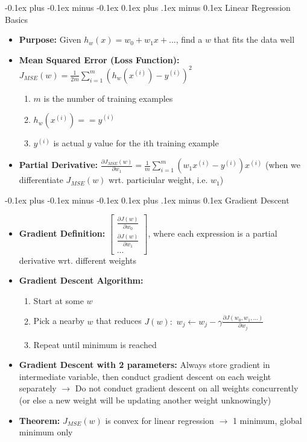 \documentclass[landscape]{article}
\makeatletter
\renewcommand{\subsection}{\@startsection{subsection}{2}{0mm}%
  {-0.1ex plus -0.1ex minus -0.1ex}%
  {0.1ex plus .1ex minus 0.1ex}%
{\normalfont\scriptsize\bfseries}}
\makeatother
\begin{document}
\begin{multicols*}{5}
      \subsection{Linear Regression Basics}
        \begin{itemize}
          \item \textbf{Purpose:} Given $h_w(x) = w_0 + w_1x + ...$, find a $w$ that fits the data well
          \item \textbf{Mean Squared Error (Loss Function):} $J_{MSE}(w) = \frac{1}{2m}\sum^m_{ i=1}(h_w(x^{(i)})-y^{(i)})^2$
          \begin{enumerate}
            \item $m$ is the number of training examples
            \item $h_w(x^{(i)}) == \hat{y}^{(i)}$
            \item $y^{(i)}$ is actual $y$ value for the ith training example
          \end{enumerate}
          \item \textbf{Partial Derivative:} $\frac{\partial J_{MSE}(w)}{\partial w_1} = \frac{1}{m}\sum^m_{i=1}(w_1x^{(i)}-y^{(i)})x^{(i)}$ (when we differentiate $J_{MSE}(w)$ wrt. particiular weight, i.e. $w_1$)
        \end{itemize}
      
        \subsection{Gradient Descent}
        \begin{itemize}
          \item \textbf{Gradient Definition:} $\begin{bmatrix} \frac{\partial J(w)}{\partial w_0} \\ \frac{\partial J(w)}{\partial w_1} \\ ... \end{bmatrix}$, where each expression is a partial derivative wrt. different weights
          \item \textbf{Gradient Descent Algorithm:}
          \begin{enumerate}
            \item Start at some $w$
            \item Pick a nearby $w$ that reduces $J(w):$ $w_j \leftarrow w_j - \gamma \frac{\partial J(w_0, w_1, ...)}{\partial w_j}$
            \item Repeat until minimum is reached
          \end{enumerate}
          \item \textbf{Gradient Descent with 2 parameters:} Always store gradient in intermediate variable, then conduct gradient descent on each weight separately $\rightarrow$ Do not conduct gradient descent on all weights concurrently (or else a new weight will be updating another weight unknowingly)
          \item \textbf{Theorem:} $J_{MSE}(w)$ is convex for linear regression $\rightarrow$ 1 minimum, global minimum only
        \end{itemize}


\end{multicols*}
\end{document}
